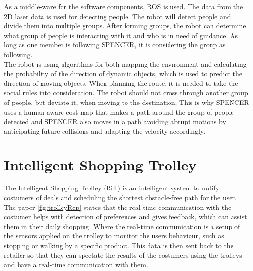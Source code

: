 As a middle-ware for the software components, ROS is used\cite{SPENCER_paper}.
The data from the 2D laser data is used for detecting people. The robot will detect people and divide them into multiple groups. After forming groups, the robot can determine what group of people is interacting with it and who is in need of guidance. %
As long as one member is following SPENCER, it is considering the group as following.\\

The robot is using algorithms for both mapping the environment and calculating the probability of the direction of dynamic objects, which is used to predict the direction of moving objects. When planning the route, it is needed to take the social rules into consideration. The robot should not cross through another group of people, but deviate it, when moving to the destination. This is why SPENCER uses a human-aware cost map that makes a path around the group of people detected and SPENCER also moves in a path avoiding abrupt motions by anticipating future collisions and adapting the velocity accordingly\cite{SPENCER_paper}.


\section{Intelligent Shopping Trolley}\label{sec:IST}
The Intelligent Shopping Trolley (IST) is an intelligent system to notify costumers of deals and scheduling the shortest obstacle-free path for the user.
The paper \ref{fig:trolleyRep} states that the real-time communication with the costumer helps with detection of preferences and gives feedback, which can assist them in their daily shopping. Where the real-time communication is a setup of the sensors applied on the trolley to monitor the users behaviour, such as stopping or walking by a specific product. This data is then sent back to the retailer so that they can spectate the results of the costumers using the trolleys and have a real-time communication with them.\\

